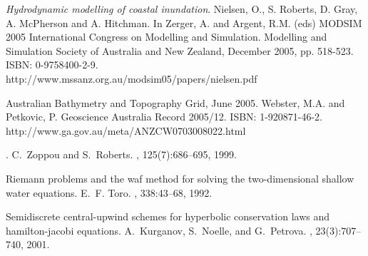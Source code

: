 \documentclass{manual}
\begin{document}

%
%
%




\begin{thebibliography}{99}
{\it Hydrodynamic modelling of coastal inundation}.
Nielsen, O., S. Roberts, D. Gray, A. McPherson and A. Hitchman.
In Zerger, A. and Argent, R.M. (eds) MODSIM 2005 International Congress on
Modelling and Simulation. Modelling and Simulation Society of Australia and
New Zealand, December 2005, pp. 518-523. ISBN: 0-9758400-2-9.\\
http://www.mssanz.org.au/modsim05/papers/nielsen.pdf

Australian Bathymetry and Topography Grid, June 2005.
Webster, M.A. and Petkovic, P.
Geoscience Australia Record 2005/12. ISBN: 1-920871-46-2.\\
http://www.ga.gov.au/meta/ANZCW0703008022.html

.
\newblock C.~Zoppou and S.~Roberts.
, 125(7):686--695, 1999.

\newblock Riemann problems and the waf method for solving the two-dimensional
  shallow water equations.
\newblock E.~F. Toro.
,
  338:43--68, 1992.

\newblock Semidiscrete central-upwind schemes for hyperbolic conservation laws
  and hamilton-jacobi equations.
\newblock A.~Kurganov, S.~Noelle, and G.~Petrova.
, 23(3):707--740, 2001.
\end{thebibliography}
\end{document}

